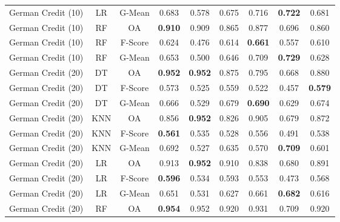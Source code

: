 \begin{longtable}{ccccccccc}
German Credit (10) &         LR &  G-Mean &          0.683 &          0.578 &          0.675 &          0.716 & \textbf{0.722} &          0.681 \\
German Credit (10) &         RF &      OA & \textbf{0.910} &          0.909 &          0.865 &          0.877 &          0.696 &          0.860 \\
German Credit (10) &         RF & F-Score &          0.624 &          0.476 &          0.614 & \textbf{0.661} &          0.557 &          0.610 \\
German Credit (10) &         RF &  G-Mean &          0.653 &          0.500 &          0.646 &          0.709 & \textbf{0.729} &          0.628 \\
German Credit (20) &         DT &      OA & \textbf{0.952} & \textbf{0.952} &          0.875 &          0.795 &          0.668 &          0.880 \\
German Credit (20) &         DT & F-Score &          0.573 &          0.525 &          0.559 &          0.522 &          0.457 & \textbf{0.579} \\
German Credit (20) &         DT &  G-Mean &          0.666 &          0.529 &          0.679 & \textbf{0.690} &          0.629 &          0.674 \\
German Credit (20) &        KNN &      OA &          0.856 & \textbf{0.952} &          0.826 &          0.905 &          0.679 &          0.872 \\
German Credit (20) &        KNN & F-Score & \textbf{0.561} &          0.535 &          0.528 &          0.556 &          0.491 &          0.538 \\
German Credit (20) &        KNN &  G-Mean &          0.692 &          0.527 &          0.635 &          0.570 & \textbf{0.709} &          0.601 \\
German Credit (20) &         LR &      OA &          0.913 & \textbf{0.952} &          0.910 &          0.838 &          0.680 &          0.891 \\
German Credit (20) &         LR & F-Score & \textbf{0.596} &          0.534 &          0.593 &          0.553 &          0.473 &          0.568 \\
German Credit (20) &         LR &  G-Mean &          0.651 &          0.531 &          0.627 &          0.661 & \textbf{0.682} &          0.616 \\
German Credit (20) &         RF &      OA & \textbf{0.954} &          0.952 &          0.920 &          0.931 &          0.709 &          0.920 \\

\end{longtable}
